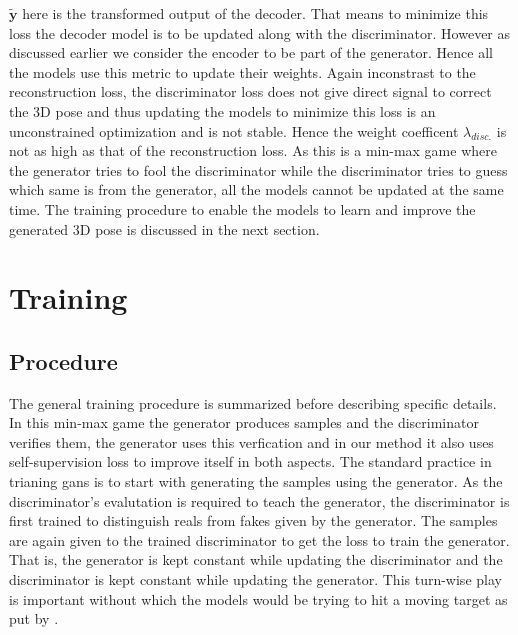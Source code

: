 $\tilde{\textbf{y}}$ here is the transformed output of the decoder. That means to minimize this loss the decoder model is to be updated along with the discriminator. However as discussed earlier we consider the encoder to be part of the generator. Hence all the models use this metric to update their weights. Again inconstrast to the reconstruction loss, the discriminator loss does not give direct signal to correct the 3D pose and thus updating the models to minimize this loss is an unconstrained optimization and is not stable. Hence the weight coefficent $\lambda_{disc.}$ is not as high as that of the reconstruction loss. As this is a min-max game where the generator tries to fool the discriminator while the discriminator tries to guess which same is from the generator, all the models cannot be updated at the same time. The training procedure to enable the models to learn and improve the generated 3D pose is discussed in the next section.


\section{Training}

\subsection{Procedure}
The general training procedure is summarized before describing specific details. In this min-max game the generator produces samples and the discriminator verifies them, the generator uses this verfication and in our method it also uses self-supervision loss to improve itself in both aspects. The standard practice in trianing \acp{gan} is to start with generating the samples using the generator. As the discriminator's evalutation is required to teach the generator, the discriminator is first trained to distinguish reals from fakes given by the generator. The samples are again given to the trained discriminator to get the loss to train the generator. That is, the generator is kept constant while updating the discriminator and the discriminator is kept constant while updating the generator. This turn-wise play is important without which the models would be trying to hit a moving target as put by \cite{gan_training_google}.

